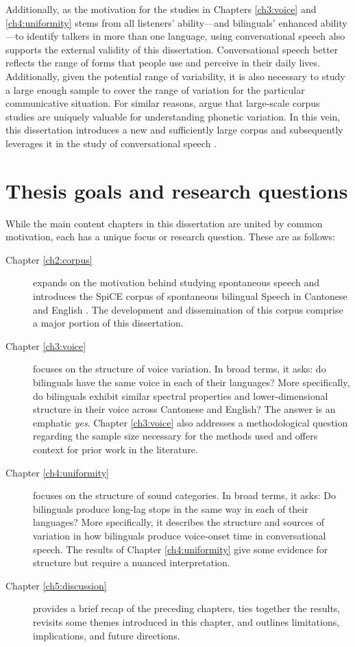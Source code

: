 Additionally, as the motivation for the studies in Chapters \ref{ch3:voice} and \ref{ch4:uniformity} stems from all listeners' ability---and bilinguals' enhanced ability---to identify talkers in more than one language, using conversational speech also supports the external validity of this dissertation. Conversational speech better reflects the range of forms that people use and perceive in their daily lives. Additionally, given the potential range of variability, it is also necessary to study a large enough sample to cover the range of variation for the particular communicative situation. For similar reasons, \citet{tanner_2020_english} argue that large-scale corpus studies are uniquely valuable for understanding phonetic variation. In this vein, this dissertation introduces a new and sufficiently large corpus and subsequently leverages it in the study of conversational speech \citep[SpiCE;][]{johnson_2021_spice}.

\section{Thesis goals and research questions}\label{ch1:sec:goals}

While the main content chapters in this dissertation are united by common motivation, each has a unique focus or research question. These are as follows:

\begin{description}
    \item[Chapter \ref{ch2:corpus}] expands on the motivation behind studying spontaneous speech and introduces the SpiCE corpus of spontaneous bilingual Speech in Cantonese and English \citep{johnson_2021_spice}. The development and dissemination of this corpus comprise a major portion of this dissertation.
    \item[Chapter \ref{ch3:voice}] focuses on the structure of voice variation. In broad terms, it asks: do bilinguals have the same voice in each of their languages? More specifically, do bilinguals exhibit similar spectral properties and lower-dimensional structure in their voice across Cantonese and English? The answer is an emphatic \textit{yes}. Chapter \ref{ch3:voice} also addresses a methodological question regarding the sample size necessary for the methods used and offers context for prior work in the literature. 
    \item[Chapter \ref{ch4:uniformity}] focuses on the structure of sound categories. In broad terms, it asks: Do bilinguals produce long-lag stops in the same way in each of their languages? More specifically, it describes the structure and sources of variation in how bilinguals produce voice-onset time in conversational speech. The results of Chapter \ref{ch4:uniformity} give some evidence for structure but require a nuanced interpretation. 
    \item[Chapter \ref{ch5:discussion}] provides a brief recap of the preceding chapters, ties together the results, revisits some themes introduced in this chapter, and outlines limitations, implications, and future directions.  
\end{description}

